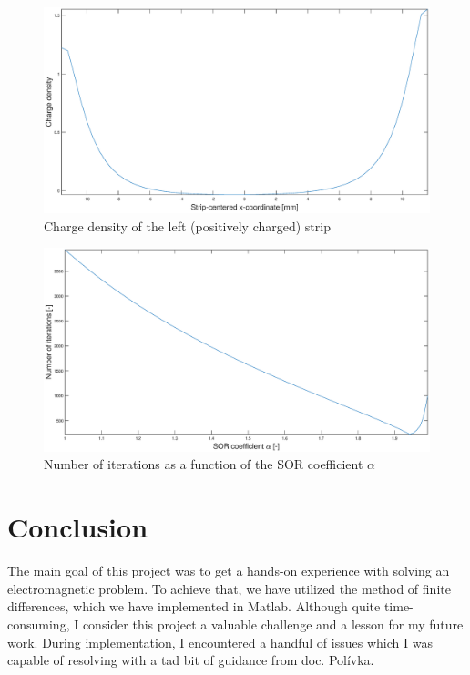 \documentclass[11pt,a4paper]{article}
\begin{document}
\begin{figure}[!ht]
    \centering
    \includegraphics[width=\textwidth]{src/charge_density.eps}
    \caption{Charge density of the left (positively charged) strip}
    \label{fig:charge-density}
\end{figure}
\begin{figure}[!ht]
    \centering
    \includegraphics[width=\textwidth]{src/iterations.eps}
    \caption{Number of iterations as a function of the SOR coefficient $\alpha$}
    \label{fig:iterations}
\end{figure}

\section{Conclusion}
The main goal of this project was to get a hands-on experience with solving an electromagnetic problem. To achieve that, we have utilized the method of finite differences, which we have implemented in Matlab. Although quite time-consuming, I consider this project a valuable challenge and a lesson for my future work. During implementation, I encountered a handful of issues which I was capable of resolving with a tad bit of guidance from doc. Polívka.
\end{document}
